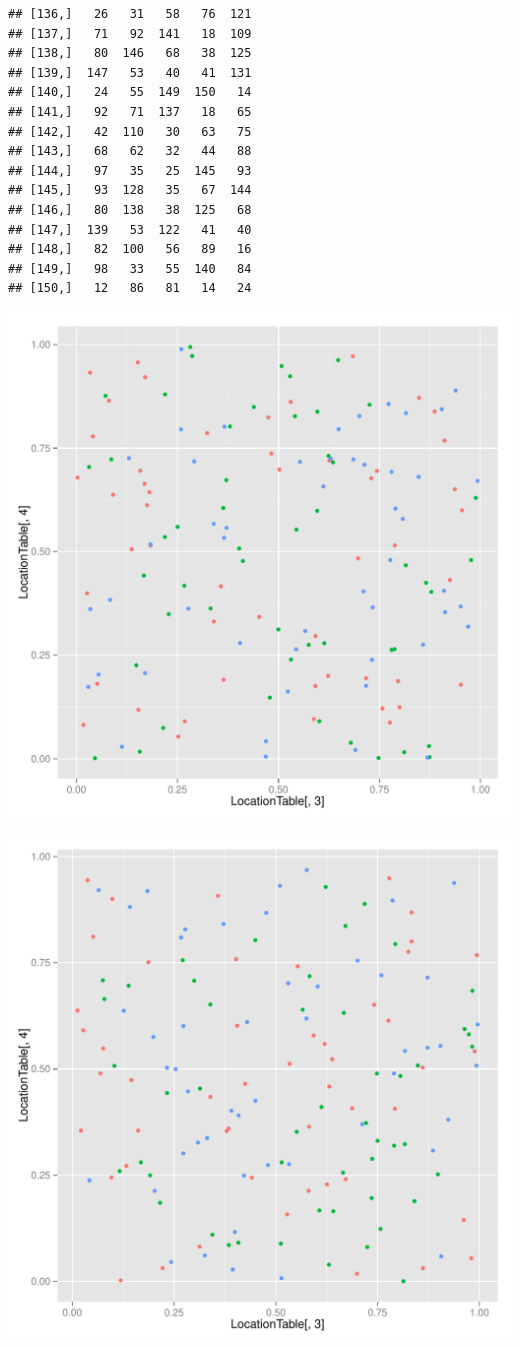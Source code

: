 \documentclass{article}\usepackage[]{graphicx}\usepackage[]{color}
\makeatletter
\def\maxwidth{ %
  \ifdim\Gin@nat@width>\linewidth
    \linewidth
  \else
    \Gin@nat@width
  \fi
}
\newenvironment{kframe}{%
 \def\at@end@of@kframe{}%
 \ifinner\ifhmode%
  \def\at@end@of@kframe{\end{minipage}}%
  \begin{minipage}{\columnwidth}%
 \fi\fi%
 \def\FrameCommand##1{\hskip\@totalleftmargin \hskip-\fboxsep
 \colorbox{shadecolor}{##1}\hskip-\fboxsep
     \hskip-\linewidth \hskip-\@totalleftmargin \hskip\columnwidth}%
 \MakeFramed {\advance\hsize-\width
   \@totalleftmargin\z@ \linewidth\hsize
   \@setminipage}}%
 {\par\unskip\endMakeFramed%
 \at@end@of@kframe}
\newenvironment{knitrout}{}{} %
\makeatother
\begin{document}
\begin{knitrout}
\begin{kframe}
\begin{verbatim}
## [136,]   26   31   58   76  121
## [137,]   71   92  141   18  109
## [138,]   80  146   68   38  125
## [139,]  147   53   40   41  131
## [140,]   24   55  149  150   14
## [141,]   92   71  137   18   65
## [142,]   42  110   30   63   75
## [143,]   68   62   32   44   88
## [144,]   97   35   25  145   93
## [145,]   93  128   35   67  144
## [146,]   80  138   38  125   68
## [147,]  139   53  122   41   40
## [148,]   82  100   56   89   16
## [149,]   98   33   55  140   84
## [150,]   12   86   81   14   24
\end{verbatim}
\end{kframe}
\includegraphics[width=\maxwidth]{figure/unnamed-chunk-2-2} 

\includegraphics[width=\maxwidth]{figure/unnamed-chunk-2-3} 


\end{knitrout}
\end{document}
